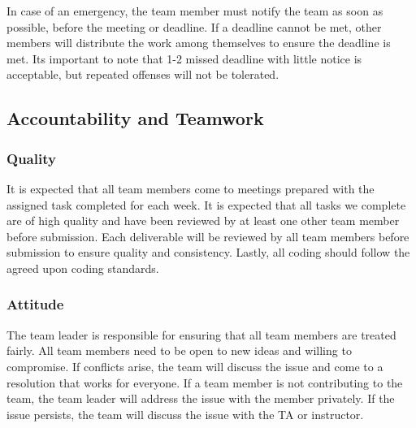 \documentclass{article}
\begin{document}
\raggedright
In case of an emergency, the team member must notify the team as soon as possible, before
the meeting or deadline. If a deadline cannot be met, other members will distribute 
the work among themselves to ensure the deadline is met. Its important to note that 
1-2 missed deadline with little notice is acceptable, but repeated offenses will not 
be tolerated.

\subsection*{Accountability and Teamwork}

\subsubsection*{Quality} 


\raggedright
It is expected that all team members come to meetings prepared with the assigned
task completed for each week. It is expected that all tasks we complete are of high quality
and have been reviewed by at least one other team member before submission. Each
deliverable will be reviewed by all team members before submission to ensure quality 
and consistency. Lastly, all coding should follow the agreed upon coding standards.


\subsubsection*{Attitude}


\raggedright
The team leader is responsible for ensuring that all team members are treated fairly.
All team members need to be open to new ideas and willing to compromise. If conflicts
arise, the team will discuss the issue and come to a resolution that works for everyone.
If a team member is not contributing to the team, the team leader will address the issue
with the member privately. If the issue persists, the team will discuss the issue with
the TA or instructor.
\end{document}
